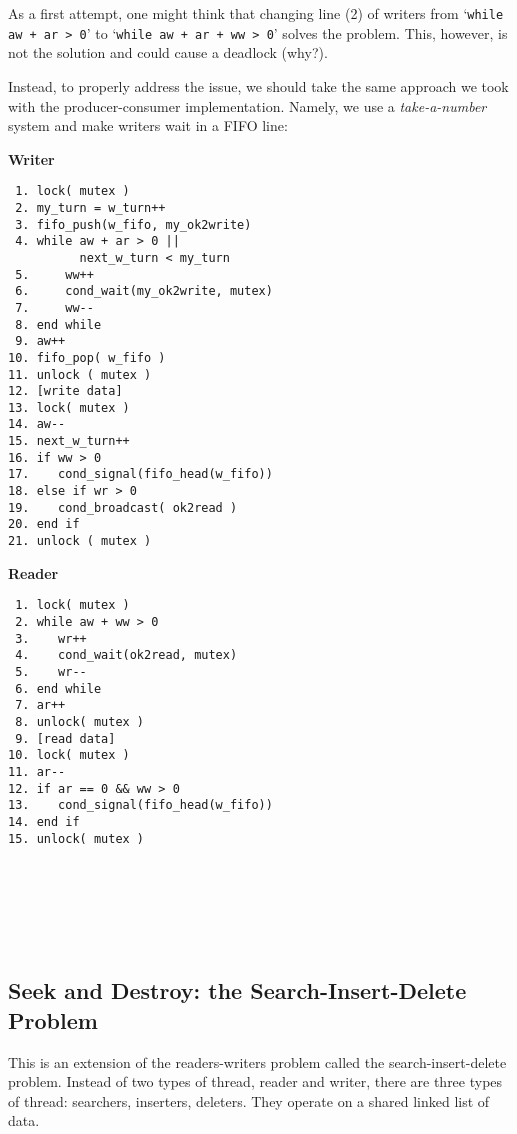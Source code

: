 As a first attempt, one might think that changing line (2) of writers from `\texttt{while aw + ar > 0}' to `\texttt{while aw + ar + ww > 0}' solves the problem.
This, however, is not the solution and could cause a deadlock (why?).

Instead, to properly address the issue, we should take the same approach we took with the producer-consumer implementation.
Namely, we use a \emph{take-a-number} system and make writers wait in a FIFO line:

\newpage

\begin{multicols}{2}
    \textbf{Writer}\vspace{-2em}
    \begin{verbatim}
 1. lock( mutex )
 2. my_turn = w_turn++
 3. fifo_push(w_fifo, my_ok2write)
 4. while aw + ar > 0 ||
          next_w_turn < my_turn
 5.     ww++
 6.     cond_wait(my_ok2write, mutex)
 7.     ww--
 8. end while
 9. aw++
10. fifo_pop( w_fifo )
11. unlock ( mutex )
12. [write data]
13. lock( mutex )
14. aw--
15. next_w_turn++
16. if ww > 0
17.    cond_signal(fifo_head(w_fifo))
18. else if wr > 0
19.    cond_broadcast( ok2read )
20. end if
21. unlock ( mutex )
    \end{verbatim}
    \columnbreak
    \textbf{Reader}\vspace{-2em}
    \begin{verbatim}
 1. lock( mutex )
 2. while aw + ww > 0
 3.    wr++
 4.    cond_wait(ok2read, mutex)
 5.    wr--
 6. end while
 7. ar++
 8. unlock( mutex )
 9. [read data]
10. lock( mutex )
11. ar--
12. if ar == 0 && ww > 0
13.    cond_signal(fifo_head(w_fifo))
14. end if
15. unlock( mutex )







    \end{verbatim}
\end{multicols}
\vspace{-2em}

\subsection*{Seek and Destroy: the Search-Insert-Delete Problem}

This is an extension of the readers-writers problem called the search-insert-delete problem. Instead of two types of thread, reader and writer, there are three types of thread: searchers, inserters, deleters. They operate on a shared linked list of data.

